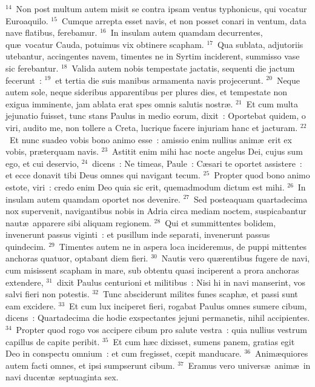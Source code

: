 ${}^{14}$~Non post multum autem misit se contra ipsam ventus typhonicus, qui vocatur Euroaquilo.
${}^{15}$~Cumque arrepta esset navis, et non posset conari in ventum, data nave flatibus, ferebamur.
${}^{16}$~In insulam autem quamdam decurrentes, qu\ae\ vocatur Cauda, potuimus vix obtinere scapham.
${}^{17}$~Qua sublata, adjutoriis utebantur, accingentes navem, timentes ne in Syrtim inciderent, summisso vase sic ferebantur.
${}^{18}$~Valida autem nobis tempestate jactatis, sequenti die jactum fecerunt~:
${}^{19}$~et tertia die suis manibus armamenta navis projecerunt.
${}^{20}$~Neque autem sole, neque sideribus apparentibus per plures dies, et tempestate non exigua imminente, jam ablata erat spes omnis salutis nostr\ae .
${}^{21}$~Et cum multa jejunatio fuisset, tunc stans Paulus in medio eorum, dixit~: Oportebat quidem, o viri, audito me, non tollere a Creta, lucrique facere injuriam hanc et jacturam.
${}^{22}$~Et nunc suadeo vobis bono animo esse~: amissio enim nullius anim\ae\ erit ex vobis, pr\ae terquam navis.
${}^{23}$~Astitit enim mihi hac nocte angelus Dei, cujus sum ego, et cui deservio,
${}^{24}$~dicens~: Ne timeas, Paule~: C\ae sari te oportet assistere~: et ecce donavit tibi Deus omnes qui navigant tecum.
${}^{25}$~Propter quod bono animo estote, viri~: credo enim Deo quia sic erit, quemadmodum dictum est mihi.
${}^{26}$~In insulam autem quamdam oportet nos devenire.
${}^{27}$~Sed posteaquam quartadecima nox supervenit, navigantibus nobis in Adria circa mediam noctem, suspicabantur naut\ae\ apparere sibi aliquam regionem.
${}^{28}$~Qui et summittentes bolidem, invenerunt passus viginti~: et pusillum inde separati, invenerunt passus quindecim.
${}^{29}$~Timentes autem ne in aspera loca incideremus, de puppi mittentes anchoras quatuor, optabant diem fieri.
${}^{30}$~Nautis vero qu\ae rentibus fugere de navi, cum misissent scapham in mare, sub obtentu quasi inciperent a prora anchoras extendere,
${}^{31}$~dixit Paulus centurioni et militibus~: Nisi hi in navi manserint, vos salvi fieri non potestis.
${}^{32}$~Tunc absciderunt milites funes scaph\ae , et passi sunt eam excidere.
${}^{33}$~Et cum lux inciperet fieri, rogabat Paulus omnes sumere cibum, dicens~: Quartadecima die hodie exspectantes jejuni permanetis, nihil accipientes.
${}^{34}$~Propter quod rogo vos accipere cibum pro salute vestra~: quia nullius vestrum capillus de capite peribit.
${}^{35}$~Et cum h\ae c dixisset, sumens panem, gratias egit Deo in conspectu omnium~: et cum fregisset, cœpit manducare.
${}^{36}$~Anim\ae quiores autem facti omnes, et ipsi sumpserunt cibum.
${}^{37}$~Eramus vero univers\ae\ anim\ae\ in navi ducent\ae\ septuaginta sex.
